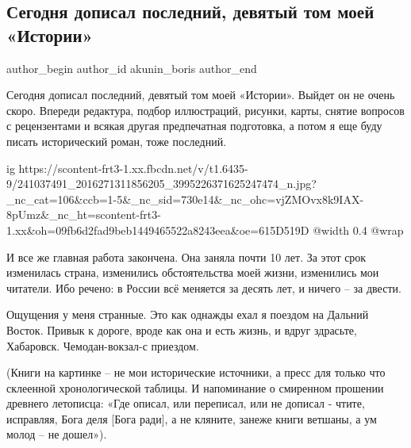  
 
 
 
 
 
\subsection{Сегодня дописал последний, девятый том моей «Истории»}
\label{sec:31_08_2021.fb.akunin_boris.1.kniga_istoria_rossia}
 
\ifcmt
 author_begin
   author_id akunin_boris
 author_end
\fi

Сегодня дописал последний, девятый том моей «Истории». Выйдет он не очень
скоро. Впереди редактура, подбор иллюстраций, рисунки, карты, снятие вопросов с
рецензентами и всякая другая предпечатная подготовка, а потом я еще буду писать
исторический роман, тоже последний. 

\ifcmt
  ig https://scontent-frt3-1.xx.fbcdn.net/v/t1.6435-9/241037491_2016271311856205_3995226371625247474_n.jpg?_nc_cat=106&ccb=1-5&_nc_sid=730e14&_nc_ohc=vjZMOvx8k9IAX-8pUmz&_nc_ht=scontent-frt3-1.xx&oh=09fb6d2fad9beb1449465522a8243eea&oe=615D519D
  @width 0.4
  @wrap \parpic[r]
\fi

И все же главная работа закончена. Она заняла почти 10 лет. За этот срок
изменилась страна, изменились обстоятельства моей жизни, изменились мои
читатели. Ибо речено: в России всё меняется за десять лет, и ничего – за
двести. 

Ощущения у меня странные. Это как однажды  ехал я поездом на Дальний Восток.
Привык к дороге, вроде как она и есть жизнь, и вдруг здрасьте, Хабаровск.
Чемодан-вокзал-с приездом.  

(Книги на картинке – не мои исторические источники, а пресс для только что
склеенной хронологической таблицы. И напоминание о смиренном прошении древнего
летописца: «Где описал, или переписал, или не дописал - чтите, исправляя, Бога
деля [Бога ради], а не кляните, занеже книги ветшаны, а ум молод – не дошел»).
